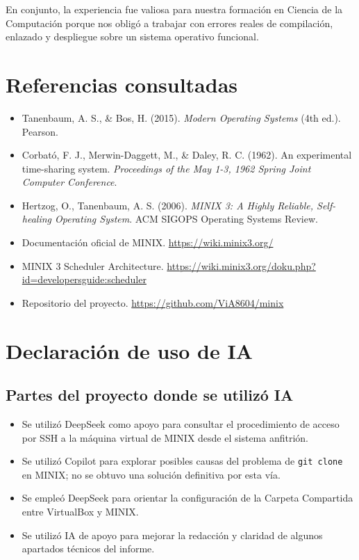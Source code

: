 \documentclass[12pt,spanish]{article}
\begin{document}
En conjunto, la experiencia fue valiosa para nuestra formación en Ciencia de la Computación porque nos obligó a trabajar con errores reales de compilación, enlazado y despliegue sobre un sistema operativo funcional.

\section{Referencias consultadas}

\begin{itemize}
    \item Tanenbaum, A. S., \& Bos, H. (2015). \textit{Modern Operating Systems} (4th ed.). Pearson.
    \item Corbató, F. J., Merwin-Daggett, M., \& Daley, R. C. (1962). An experimental time-sharing system. \textit{Proceedings of the May 1-3, 1962 Spring Joint Computer Conference}.
    \item Hertzog, O., Tanenbaum, A. S. (2006). \textit{MINIX 3: A Highly Reliable, Self-healing Operating System}. ACM SIGOPS Operating Systems Review.
    \item Documentación oficial de MINIX. \url{https://wiki.minix3.org/}
    \item MINIX 3 Scheduler Architecture. \url{https://wiki.minix3.org/doku.php?id=developersguide:scheduler}
    \item Repositorio del proyecto. \url{https://github.com/ViA8604/minix}
\end{itemize}

\section{Declaración de uso de IA}

\subsection*{Partes del proyecto donde se utilizó IA}

\begin{itemize}
    \item Se utilizó DeepSeek como apoyo para consultar el procedimiento de acceso por SSH a la máquina virtual de MINIX desde el sistema anfitrión.
    \item Se utilizó Copilot para explorar posibles causas del problema de \texttt{git clone} en MINIX; no se obtuvo una solución definitiva por esta vía.
    \item Se empleó DeepSeek para orientar la configuración de la Carpeta Compartida entre VirtualBox y MINIX.
    \item Se utilizó IA de apoyo para mejorar la redacción y claridad de algunos apartados técnicos del informe.
\end{itemize}
\end{document}
